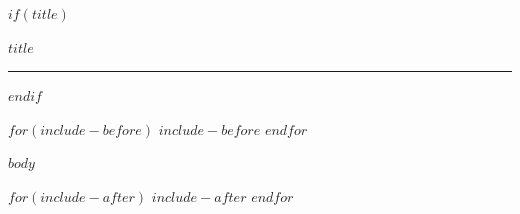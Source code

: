 \documentclass[UTF8,12pt,a4paper]{ctexart}
\begin{document}
\color{ExamInk}

$if(title)$
\begin{center}
  {\LARGE\bfseries\color{ExamNavy}$title$\par}
  \vspace{0.35em}
  {\color{ExamGold}\rule{0.28\textwidth}{1.2pt}}
\end{center}
\vspace{0.8em}
$endif$

$for(include-before)$
$include-before$
$endfor$

$body$

$for(include-after)$
$include-after$
$endfor$
\end{document}
